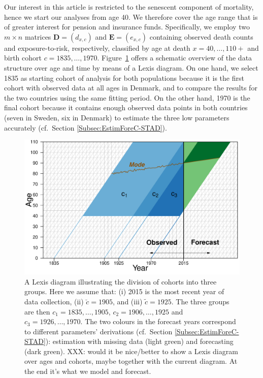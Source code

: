 \documentclass[11pt, a4paper]{article}
\begin{document}
Our interest in this article is restricted to the senescent component of mortality, hence we start our analyses from age 40. We therefore cover the age range that is of greater interest for pension and insurance funds. Specifically, we employ two $m \times n$ matrices $\bm{D} = (d_{x,c})$ and $\bm{E} = (e_{x,c})$ containing observed death counts and exposure-to-risk, respectively, classified by age at death $x=40,\ldots, 110+$ and birth cohort $c=1835,\ldots,1970$. Figure~\ref{Fig:Lexis} offers a schematic overview of the data structure over age and time by means of a Lexis diagram. On one hand, we select 1835 as starting cohort of analysis for both populations because it is the first cohort with observed data at all ages in Denmark, and to compare the results for the two countries using the same fitting period. On the other hand, 1970 is the final cohort because it contains enough observed data points in both countries (seven in Sweden, six in Denmark) to estimate the three low parameters accurately (cf.~Section \ref{Subsec:EstimForeC-STAD}). 

\begin{figure}[t]
	\begin{center}
		\includegraphics[scale=0.7]{./Figures/F2.pdf} 
		\caption{A Lexis diagram illustrating the division of cohorts into three groups. Here we assume that: (i) 2015 is the most recent year of data collection, (ii) $\breve{c}=1905$, and (iii) $\tilde{c}=1925$. The three groups are then $c_1=1835, \ldots, 1905$, $c_2=1906, \ldots, 1925$ and $c_3=1926, \ldots, 1970$. The two colours in the forecast years correspond to different parameters' derivations (cf.~Section \ref{Subsec:EstimForeC-STAD}): estimation with missing data (light green) and forecasting (dark green). XXX: would it be nice/better to show a Lexis diagram over ages and cohorts, maybe together with the current diagram. At the end it's what we model and forecast.\label{Fig:Lexis}}    
	\end{center}
\end{figure}
\end{document}
